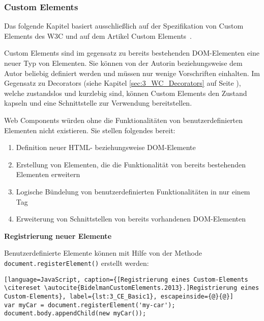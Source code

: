 \subsubsection{Custom Elements}
\label{sec:3_WC_Elements}

Das folgende Kapitel basiert ausschließlich auf der Spezifikation von Custom Elements des W3C \citereset \autocite[siehe][]{Glakov.2013} und auf dem Artikel \glqq Custom Elements\grqq\ \citereset \autocite[siehe][]{BidelmanCustomElements.2013}.

Custom Elements sind im gegensatz zu bereits bestehenden DOM-Elementen eine neuer Typ von Elementen. Sie können von der Autorin beziehungsweise dem Autor beliebig definiert werden und müssen nur wenige Vorschriften einhalten. Im Gegensatz zu Decorators (siehe Kapitel \ref{sec:3_WC_Decorators} auf Seite \pageref{sec:3_WC_Decorators}), welche zustandslos und kurzlebig sind, können Custom Elements den Zustand kapseln und eine Schnittstelle zur Verwendung bereitstellen.

Web Components würden ohne die Funktionalitäten von benutzerdefinierten Elementen nicht existieren. Sie stellen folgendes bereit:
\begin{enumerate}
\item Definition neuer HTML- beziehungsweise DOM-Elemente
\item Erstellung von Elementen, die die Funktionalität von bereits bestehenden Elementen erweitern
\item Logische Bündelung von benutzerdefinierten Funktionalitäten in nur einem Tag
\item Erweiterung von Schnittstellen von bereits vorhandenen DOM-Elementen
\end{enumerate}

\textbf{Registrierung neuer Elemente}

Benutzerdefinierte Elemente können mit Hilfe von der Methode \lstinline|document.registerElement()| erstellt werden:

\begin{lstlisting}[language=JavaScript, caption={[Registrierung eines Custom-Elements \citereset \autocite{BidelmanCustomElements.2013}.]Registrierung eines Custom-Elements}, label={lst:3_CE_Basic1}, escapeinside={@}{@}]
var myCar = document.registerElement('my-car');
document.body.appendChild(new myCar());
\end{lstlisting}

